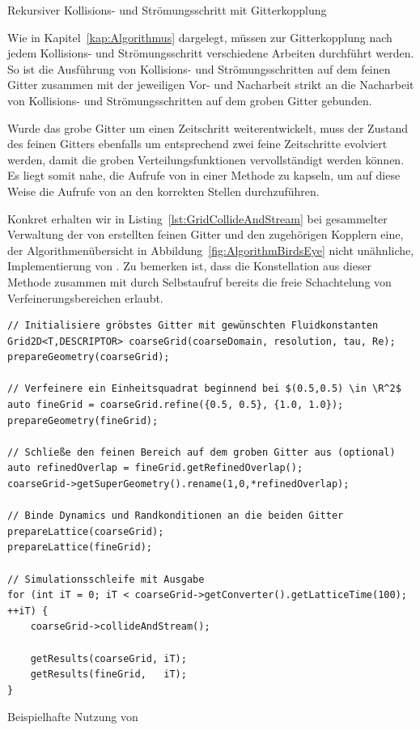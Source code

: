 \begin{listing}[H]
\inputminted{cpp}{code/grid2d_collide_and_stream.cpp}
\caption{Rekursiver Kollisions- und Strömungsschritt mit Gitterkopplung}
\label{lst:GridCollideAndStream}
\end{listing}

Wie in Kapitel~\ref{kap:Algorithmus} dargelegt, müssen zur Gitterkopplung nach jedem Kollisions- und Strömungsschritt verschiedene Arbeiten durchführt werden. So ist die Ausführung von Kollisions- und Strömungsschritten auf dem feinen Gitter zusammen mit der jeweiligen Vor- und Nacharbeit strikt an die Nacharbeit von Kollisions- und Strömungsschritten auf dem groben Gitter gebunden.

Wurde das grobe Gitter um einen Zeitschritt weiterentwickelt, muss der Zustand des feinen Gitters ebenfalls um entsprechend zwei feine Zeitschritte evolviert werden, damit die groben Verteilungsfunktionen vervollständigt werden können. Es liegt somit nahe, die Aufrufe von  in einer  Methode zu kapseln, um auf diese Weise die Aufrufe von  an den korrekten Stellen durchzuführen.

Konkret erhalten wir in Listing~\ref{lst:GridCollideAndStream} bei gesammelter Verwaltung der von  erstellten feinen Gitter und den zugehörigen Kopplern eine, der Algorithmenübersicht in Abbildung~\ref{fig:AlgorithmBirdsEye} nicht unähnliche, Implementierung von .
Zu bemerken ist, dass die Konstellation aus dieser Methode zusammen mit  durch Selbstaufruf bereits die freie Schachtelung von Verfeinerungsbereichen erlaubt.

\begin{listing}[H]
\begin{verbatim}
// Initialisiere gröbstes Gitter mit gewünschten Fluidkonstanten
Grid2D<T,DESCRIPTOR> coarseGrid(coarseDomain, resolution, tau, Re);
prepareGeometry(coarseGrid);

// Verfeinere ein Einheitsquadrat beginnend bei $(0.5,0.5) \in \R^2$
auto fineGrid = coarseGrid.refine({0.5, 0.5}, {1.0, 1.0});
prepareGeometry(fineGrid);

// Schließe den feinen Bereich auf dem groben Gitter aus (optional)
auto refinedOverlap = fineGrid.getRefinedOverlap();
coarseGrid->getSuperGeometry().rename(1,0,*refinedOverlap);

// Binde Dynamics und Randkonditionen an die beiden Gitter
prepareLattice(coarseGrid);
prepareLattice(fineGrid);

// Simulationsschleife mit Ausgabe
for (int iT = 0; iT < coarseGrid->getConverter().getLatticeTime(100); ++iT) {
	coarseGrid->collideAndStream();

	getResults(coarseGrid, iT);
	getResults(fineGrid,   iT);
}
\end{verbatim}
\caption{Beispielhafte Nutzung von }
\label{lst:RefinementUsageExample}
\end{listing}


